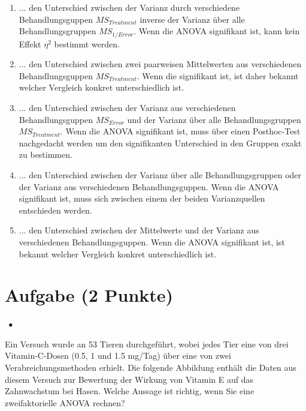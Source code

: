 \documentclass[a4paper, 9pt]{scrartcl}\usepackage[]{graphicx}\usepackage[]{xcolor}
\begin{document}
\begin{enumerate}
\item [\textbf{A} \msquare] ... den Unterschied zwischen der Varianz durch verschiedene Behandlungsguppen $MS_{Treatment}$ inverse der Varianz über alle Behandlungsgruppen $MS_{1/Error}$. Wenn die ANOVA signifikant ist, kann kein Effekt $\eta^2$ bestimmt werden.
\item [\textbf{B} \msquare] ... den Unterschied zwischen zwei paarweisen Mittelwerten aus verschiedenen Behandlungsguppen $MS_{Treatment}$. Wenn die signifikant ist, ist daher bekannt welcher Vergleich konkret unterschiedlich ist.
\item [\textbf{C} \msquare] ... den Unterschied zwischen der Varianz aus verschiedenen Behandlungsguppen $MS_{Error}$ und der Varianz über alle Behandlungsgruppen $MS_{Treatment}$. Wenn die ANOVA signifikant ist, muss über einen Posthoc-Test nachgedacht werden um den signifikanten Unterschied in den Gruppen exakt zu bestimmen.
\item [\textbf{D} \msquare] ... den Unterschied zwischen der Varianz über alle Behandlungsgruppen oder der Varianz aus verschiedenen Behandlungsguppen. Wenn die ANOVA signifikant ist, muss sich zwischen einem der beiden Varianzquellen entschieden werden.
\item [\textbf{E} \msquare] ... den Unterschied zwischen der Mittelwerte und der Varianz aus verschiedenen Behandlungsguppen. Wenn die ANOVA signifikant ist, ist bekannt welcher Vergleich konkret unterschiedlich ist.
\end{enumerate}

\section{Aufgabe \hfill (2 Punkte)}

\ifcollection
\begin{flushright}
\tiny\vspace{-2Ex}
\textbf{\examinhaltstart}
\exammodulestatversuch $\;\bullet$
\exammodulebiostat
\vspace{-1Ex}
\end{flushright}
\fi




Ein Versuch wurde an 53 Tieren durchgeführt, wobei jedes Tier eine von drei Vitamin-C-Dosen (0.5, 1 und 1.5 mg/Tag) über eine von zwei Verabreichungsmethoden erhielt. Die folgende Abbildung enthält die Daten aus diesem Versuch zur Bewertung der Wirkung von Vitamin E auf das Zahnwachstum bei Hasen.  Welche Aussage ist richtig, wenn Sie eine zweifaktorielle ANOVA rechnen?
\end{document}
